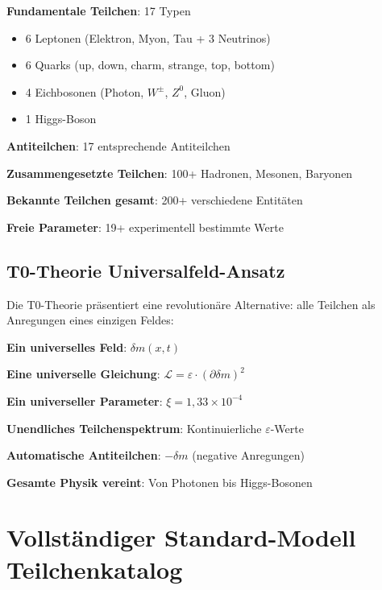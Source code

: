 \documentclass[12pt,a4paper]{article}
\newcommand{\deltam}{\delta m}
\newcommand{\xipar}{\xi}
\newcommand{\Lag}{\mathcal{L}}
\begin{document}
	\begin{tcolorbox}[colback=red!5!white,colframe=red!75!black,title=Standard-Modell Komplexitätskrise]
		\textbf{Fundamentale Teilchen}: 17 Typen
		\begin{itemize}
			\item 6 Leptonen (Elektron, Myon, Tau + 3 Neutrinos)
			\item 6 Quarks (up, down, charm, strange, top, bottom)
			\item 4 Eichbosonen (Photon, $W^{\pm}$, $Z^0$, Gluon)
			\item 1 Higgs-Boson
		\end{itemize}
		
		\textbf{Antiteilchen}: 17 entsprechende Antiteilchen
		
		\textbf{Zusammengesetzte Teilchen}: 100+ Hadronen, Mesonen, Baryonen
		
		\textbf{Bekannte Teilchen gesamt}: 200+ verschiedene Entitäten
		
		\textbf{Freie Parameter}: 19+ experimentell bestimmte Werte
	\end{tcolorbox}
	
	\subsection{T0-Theorie Universalfeld-Ansatz}
	
	Die T0-Theorie präsentiert eine revolutionäre Alternative: alle Teilchen als Anregungen eines einzigen Feldes:
	
	\begin{tcolorbox}[colback=blue!5!white,colframe=blue!75!black,title=T0 Universalfeld-Vereinfachung]
		\textbf{Ein universelles Feld}: $\deltam(x,t)$
		
		\textbf{Eine universelle Gleichung}: $\Lag = \varepsilon \cdot (\partial \deltam)^2$
		
		\textbf{Ein universeller Parameter}: $\xipar = 1{,}33 \times 10^{-4}$
		
		\textbf{Unendliches Teilchenspektrum}: Kontinuierliche $\varepsilon$-Werte
		
		\textbf{Automatische Antiteilchen}: $-\deltam$ (negative Anregungen)
		
		\textbf{Gesamte Physik vereint}: Von Photonen bis Higgs-Bosonen
	\end{tcolorbox}
	
	\section{Vollständiger Standard-Modell Teilchenkatalog}
	
\end{document}
